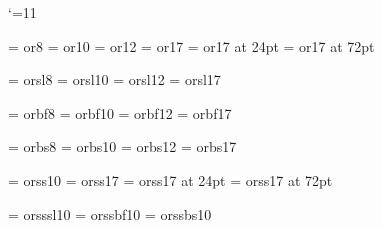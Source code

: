 %

\catcode`\@=11


\font\or@VIII   = or8
\font\or@X      = or10
\font\or@XII    = or12
\font\or@XVII   = or17
\font\or@XXIV   = or17 at 24pt
\font\or@LXXII  = or17 at 72pt

\font\orsl@VIII = orsl8
\font\orsl@X    = orsl10
\font\orsl@XII  = orsl12
\font\orsl@XVII = orsl17

\font\orbf@VIII = orbf8
\font\orbf@X    = orbf10
\font\orbf@XII  = orbf12
\font\orbf@XVII = orbf17

\font\orbs@VIII = orbs8
\font\orbs@X    = orbs10
\font\orbs@XII  = orbs12
\font\orbs@XVII = orbs17

\font\orss@X	= orss10
\font\orss@XVII	= orss17
\font\orss@XXIV = orss17 at 24pt
\font\orss@LXXII= orss17 at 72pt

\font\orsssl@X	= orsssl10
\font\orssbf@X	= orssbf10
\font\orssbs@X	= orssbs10

\def\orVIII{\or@VIII\baselineskip=9pt}
\def\or{\or@X\baselineskip=12pt}
\def\orXII{\or@XII\baselineskip=15pt}
\def\orXVII{\or@XVII\baselineskip=20pt}
\def\orXXIV{\or@XXIV\baselineskip=26pt}
\def\orLXXII{\or@LXXII\baselineskip=72pt}

\def\orsl{\orsl@X\baselineskip=12pt}
\def\orbf{\orbf@X\baselineskip=12pt}
\def\orbs{\orbs@X\baselineskip=12pt}

\def\orss{\orss@X\baselineskip=12pt}
\def\orssXVII{\orss@XVII\baselineskip=20pt}
\def\orssXXIV{\orss@XXIV\baselineskip=26pt}
\def\orssLXXII{\orss@LXXII\baselineskip=72pt}

\def\orsssl{\orsssl@X\baselineskip=12pt}
\def\orssbf{\orssbf@X\baselineskip=12pt}
\def\orssbs{\orssbs@X\baselineskip=12pt}


\def\<#1>{\char#1}



\newif\iformode\ormodefalse     %


%



